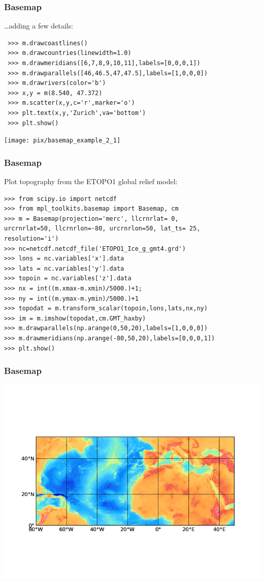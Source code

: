 \begin{frame}[fragile]
\frametitle{Basemap}
\ldots adding a few details:
\begin{myColorBox}{1.0}{}
\begin{verbatim}
 >>> m.drawcoastlines()
 >>> m.drawcountries(linewidth=1.0)
 >>> m.drawmeridians([6,7,8,9,10,11],labels=[0,0,0,1])
 >>> m.drawparallels([46,46.5,47,47.5],labels=[1,0,0,0])
 >>> m.drawrivers(color='b')
 >>> x,y = m(8.540, 47.372)
 >>> m.scatter(x,y,c='r',marker='o')
 >>> plt.text(x,y,'Zurich',va='bottom')
 >>> plt.show()
\end{verbatim}
\end{myColorBox}
\pause
\begin{center}
      \texttt{[image: pix/basemap\_example\_2\_1]}
\end{center}
\end{frame}

\begin{frame}[fragile]
\frametitle{Basemap}
Plot topography from the ETOPO1 global relief model:
\begin{myColorBox}{1.0}{}
\begin{verbatim}
>>> from scipy.io import netcdf
>>> from mpl_toolkits.basemap import Basemap, cm
>>> m = Basemap(projection='merc', llcrnrlat= 0, 
urcrnrlat=50, llcrnrlon=-80, urcrnrlon=50, lat_ts= 25, 
resolution='i')
>>> nc=netcdf.netcdf_file('ETOPO1_Ice_g_gmt4.grd')
>>> lons = nc.variables['x'].data
>>> lats = nc.variables['y'].data
>>> topoin = nc.variables['z'].data
>>> nx = int((m.xmax-m.xmin)/5000.)+1; 
>>> ny = int((m.ymax-m.ymin)/5000.)+1
>>> topodat = m.transform_scalar(topoin,lons,lats,nx,ny)
>>> im = m.imshow(topodat,cm.GMT_haxby)
>>> m.drawparallels(np.arange(0,50,20),labels=[1,0,0,0])
>>> m.drawmeridians(np.arange(-80,50,20),labels=[0,0,0,1])
>>> plt.show()
\end{verbatim}
\end{myColorBox}
\end{frame}

\begin{frame}[fragile]
\frametitle{Basemap}
\begin{center}
      \includegraphics[width=1.0\textwidth]{pix/basemap_example_3}
\end{center}
\end{frame}

